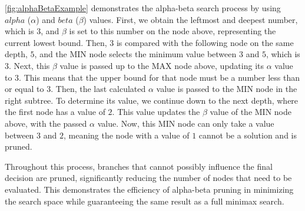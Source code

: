 \noindent\cref{fig:alphaBetaExample} demonstrates the alpha-beta search process by using $alpha$ ($\alpha$) and $beta$ ($\beta$) values. First, we obtain the leftmost and deepest number, which is $3$, and $\beta$ is set to this number on the node above, representing the current lowest bound. Then, $3$ is compared with the following node on the same depth, $5$, and the MIN node selects the minimum value between $3$ and $5$, which is $3$. Next, this $\beta$ value is passed up to the MAX node above, updating its $\alpha$ value to $3$. This means that the upper bound for that node must be a number less than or equal to $3$. Then, the last calculated $\alpha$ value is passed to the MIN node in the right subtree. To determine its value, we continue down to the next depth, where the first node has a value of $2$. This value updates the $\beta$ value of the MIN node above, with the passed $\alpha$ value. Now, this MIN node can only take a value between $3$ and $2$, meaning the node with a value of $1$ cannot be a solution and is pruned.

\vspace{1em}

\noindent Throughout this process, branches that cannot possibly influence the final decision are pruned, significantly reducing the number of nodes that need to be evaluated. This demonstrates the efficiency of alpha-beta pruning in minimizing the search space while guaranteeing the same result as a full minimax search.


